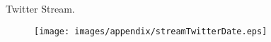 \begin{frame}{Twitter Stream}{\textcolor{UniBlue}{.}}
\begin{figure}
  \centering
    \texttt{[image: images/appendix/streamTwitterDate.eps]}
\end{figure}
\end{frame}